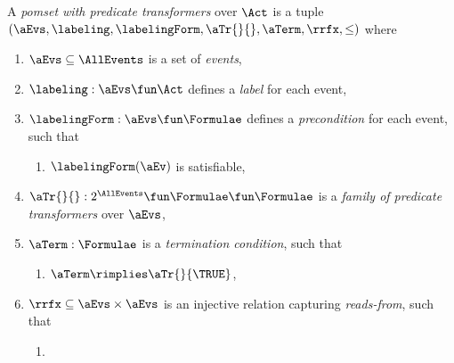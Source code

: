 \begin{definition}
  \label{def:pomset}
  A \emph{pomset with predicate transformers} over $\Act$
  is a tuple $(\aEvs, \labeling, \labelingForm, \aTr{}{}, \aTerm, {\rrfx}, {\le})$ where
  \begin{enumerate}[,label=(\textsc{m}\arabic*),ref=\textsc{m}\arabic*]
  \item \label{pom-E} 
    $\aEvs\subseteq\AllEvents$ is a set of \emph{events},
  \item \label{pom-lambda} 
    $\labeling: \aEvs \fun \Act$ defines a \emph{label} for each event,
  \item \label{pom-kappa} 
    $\labelingForm:\aEvs\fun\Formulae$ defines a \emph{precondition} for each event, such that
    \begin{enumerate}
    \item \label{pom-kappa-sat}
      $\labelingForm(\aEv)$ is satisfiable,
    \end{enumerate}
  \item \label{pom-tau} 
    $\aTr{}{}:2^{\AllEvents}\fun\Formulae \fun\Formulae$ is a \emph{family of predicate transformers} over $\aEvs$, 
  \item \label{pom-term} 
    $\aTerm:\Formulae$ is a \emph{termination condition}, such that 
    \begin{enumerate}
    \item \label{pom-term-tau}
      $\aTerm\rimplies\aTr{}{\TRUE}$,
    \end{enumerate}
  \item \label{pom-rf} 
    ${\rrfx} \subseteq \aEvs\times\aEvs$ is an injective relation capturing
    \emph{reads-from}, such that 
    \begin{enumerate}
    \item \label{pom-rf-match}

\end{enumerate}
\end{enumerate}
\end{definition}
